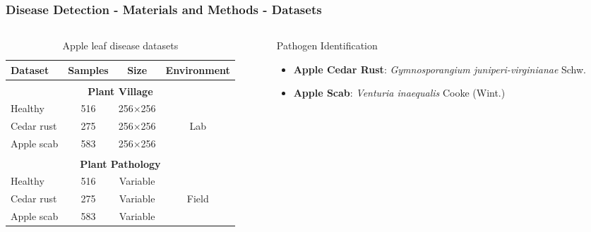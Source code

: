 \documentclass[aspectratio=43]{beamer}
\renewcommand{\thefootnote}{\arabic{footnote}}
\newcommand{\citeHughesOpen}{Hughes \& Salathé. An open access repository of images on plant health. \textit{arXiv:1511.08060}, 2015}
\newcommand{\citeThapaPlant}{Thapa et al. The Plant Pathology 2020 challenge dataset. \textit{arXiv:2004.11958}, 2020}
\newcommand{\fcite}[1]{%
  \stepcounter{footnote}%
  \textsuperscript{\thefootnote}%
  \footnotetext[\value{footnote}]{#1}%
}
\begin{document}
\begin{frame}
    \frametitle{\small Disease Detection - Materials and Methods - Datasets}
    
    \begin{columns}
        \begin{column}{0.5\textwidth}
            \begin{table}[h]
                \centering
                \caption{Apple leaf disease datasets}
                \scriptsize
                \begin{tabular}{lccc}
                \toprule
                \textbf{Dataset} & \textbf{Samples} & \textbf{Size} & \textbf{Environment} \\
                \midrule
                \multicolumn{4}{c}{\textbf{Plant Village}\fcite{\citeHughesOpen}} \\
                Healthy & 516 & 256×256 & \\
                Cedar rust & 275 & 256×256 & Lab \\
                Apple scab & 583 & 256×256 & \\
                \midrule
                \multicolumn{4}{c}{\textbf{Plant Pathology}\fcite{\citeThapaPlant}} \\
                Healthy & 516 & Variable & \\
                Cedar rust & 275 & Variable & Field \\
                Apple scab & 583 & Variable & \\
                \bottomrule
                \end{tabular}
            \end{table}
        \end{column}
        
        \begin{column}{0.3\textwidth}
            \scriptsize
            \begin{block}{\scriptsize Pathogen Identification}
                \begin{itemize}
                    \item \textbf{Apple Cedar Rust}: \textit{Gymnosporangium juniperi-virginianae} Schw.
                    \item \textbf{Apple Scab}: \textit{Venturia inaequalis} Cooke (Wint.)
                \end{itemize}
            \end{block}
            

\end{column}
\end{columns}
\end{frame}
\end{document}
